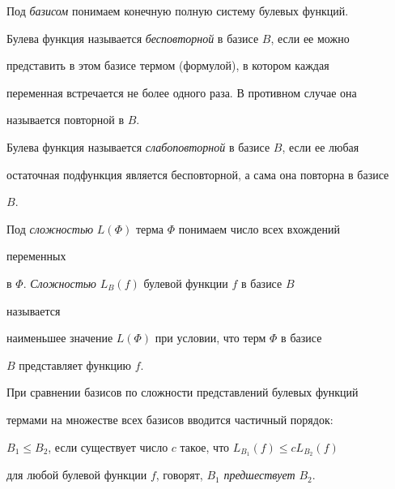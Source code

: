 \maketitle 


\label{begin} 


 


 


 


Под {\it базисом} понимаем конечную полную систему булевых функций. 


 


Булева функция называется {\it бесповторной} в базисе $B$, если ее можно 


представить в этом базисе термом (формулой), в котором каждая 


переменная встречается не более одного раза. В противном случае она 


называется повторной в $B$. 


 


Булева функция называется {\it слабоповторной} в базисе $B$, если ее любая 


остаточная подфункция является бесповторной, а сама она повторна в базисе 


$B$. 


 


Под {\it сложностью} $L(\Phi)$ терма $\Phi$ понимаем число всех вхождений 


переменных 


в $\Phi$. {\it Сложностью} $L_B(f)$ булевой функции $f$ в базисе $B$ 


называется 


наименьшее значение $L(\Phi)$ при условии, что терм $\Phi$ в базисе 


$B$ представляет функцию $f$. 


 


При сравнении базисов по сложности представлений булевых функций 


термами на множестве всех базисов вводится частичный порядок: 


$B_1\le B_2$, если существует число $c$ такое, что $L_{B_1}(f)\le c 


L_{B_2}(f)$ 


для любой булевой функции $f$, говорят, $B_1$ {\it предшествует} $B_2$. 


